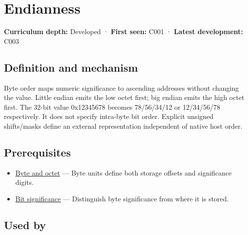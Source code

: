 \hypertarget{appendix-bc07c3d25b18}{}\label{referencestart:appendix-bc07c3d25b18}
\section{Endianness}\label{appendix-bc07c3d25b18-endianness}

\hypertarget{appendix-bc07c3d25b18-endianness}{}

\textbf{Curriculum depth:} Developed · \textbf{First seen:} C001 · \textbf{Latest development:} C003

\begin{allmightroledefinition}

\subsection{Definition and mechanism}\label{appendix-bc07c3d25b18-definition-and-mechanism}

\hypertarget{appendix-bc07c3d25b18-definition-and-mechanism}{}

Byte order maps numeric significance to ascending addresses without changing the value. Little endian emits the low octet first; big endian emits the high octet first. The 32-bit value 0x12345678 becomes 78/56/34/12 or 12/34/56/78 respectively. It does not specify intra-byte bit order. Explicit unsigned shifts/masks define an external representation independent of native host order.

\end{allmightroledefinition}

\subsection{Prerequisites}\label{appendix-bc07c3d25b18-prerequisites}

\hypertarget{appendix-bc07c3d25b18-prerequisites}{}

\begin{itemize}
\tightlist
\item
  \hyperref[appendix-5bee2df85484]{Byte and octet} --- Byte units define both storage offsets and significance digits.
\item
  \hyperref[appendix-280445746493]{Bit significance} --- Distinguish byte significance from where it is stored.
\end{itemize}

\subsection{Used by}\label{appendix-bc07c3d25b18-used-by}

